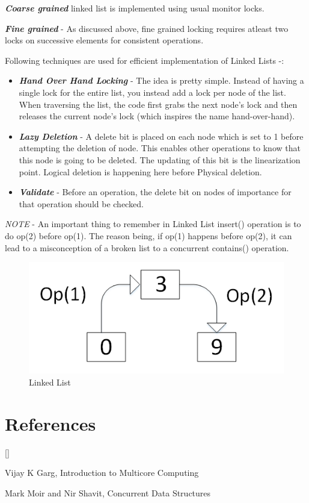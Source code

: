 \documentclass[twoside]{article}
\def\beginrefs{\begin{list}%
        {[\arabic{equation}]}{\usecounter{equation}
         \setlength{\leftmargin}{2.0truecm}\setlength{\labelsep}{0.4truecm}%
         \setlength{\labelwidth}{1.6truecm}}}
\def\endrefs{\end{list}}
\def\bibentry#1{\item[\hbox{[#1]}]}
\begin{document}
\textbf{\textit{Coarse grained}} linked list is implemented using usual monitor locks.

\textbf{\textit{Fine grained}} - As discussed above, fine grained locking requires atleast two locks on successive elements for consistent operations.

Following techniques are used for efficient implementation of Linked Lists -:
\begin{itemize}
\item \textbf{\textit{Hand Over Hand Locking}} - The idea is pretty simple. Instead of having a single lock for the entire
list, you instead add a lock per node of the list. When traversing the
list, the code first grabs the next node’s lock and then releases the current
node’s lock (which inspires the name hand-over-hand).

\item \textbf{\textit{Lazy Deletion}} - A delete bit is placed on each node which is set to 1 before attempting the deletion of node. This enables other operations to know that this node is going to be deleted. The updating of this bit is the linearization point. Logical deletion is happening here before Physical deletion.

\item \textbf{\textit{Validate}} - Before an operation, the delete bit on nodes of importance for that operation should be checked.

\end{itemize}

\textit{NOTE} - An important thing to remember in Linked List insert() operation is to do op(2) before op(1). The reason being, if op(1) happens before op(2), it can lead to a misconception of a broken list to a concurrent contains() operation.

 \begin{figure}[H]
\centering
\includegraphics[scale=0.8]{LL1}
\caption{Linked List}
\label{fig:2}
\end{figure}

\section*{References}
\beginrefs
\bibentry{1}{\sc Vijay K Garg},
Introduction to Multicore Computing
\bibentry{2}{\sc Mark Moir and Nir Shavit},
Concurrent Data Structures
\endrefs
\end{document}
